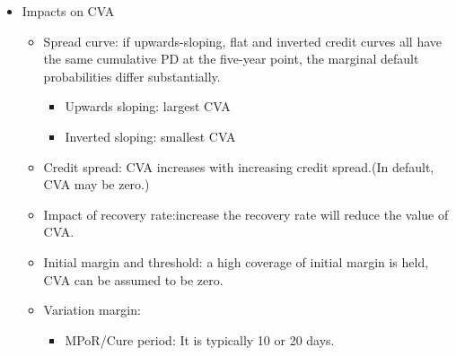\begin{itemize}
\item Impacts on CVA
\begin{itemize}
    \item Spread curve: if upwards-sloping, flat and inverted credit curves all have the same cumulative PD at the five-year point, the marginal default probabilities differ substantially.
    \begin{itemize}
        \item Upwards sloping: largest CVA
        \item Inverted sloping: smallest CVA
    \end{itemize}
\item Credit spread: CVA increases with increasing credit spread.(In default, CVA may be zero.)
 \item Impact of recovery rate:increase the recovery rate will
reduce the value of CVA.
\item  Initial margin and threshold: a high coverage of initial margin is held, CVA can be assumed to be zero.
\item Variation margin:
\begin{itemize}
    \item MPoR/Cure period: It is typically 10 or 20 days.
\end{itemize}

\end{itemize}


\end{itemize}








